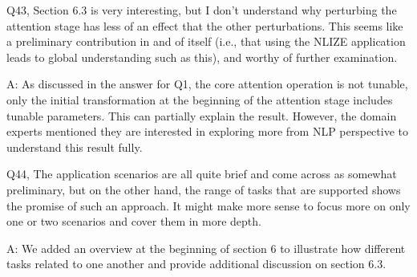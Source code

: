 Q43, Section 6.3 is very interesting, but I don't understand why perturbing the attention stage has less of an effect that the other perturbations. This seems like a preliminary contribution in and of itself (i.e., that using the NLIZE application leads to global understanding such as this), and worthy of further examination.

A: As discussed in the answer for Q1, the core attention operation is not tunable, only the initial transformation at the beginning of the attention stage includes tunable parameters. This can partially explain the result. However, the domain experts mentioned they are interested in exploring more from NLP perspective to understand this result fully.

Q44, The application scenarios are all quite brief and come across as somewhat preliminary, but on the other hand, the range of tasks that are supported shows the promise of such an approach. It might make more sense to focus more on only one or two scenarios and cover them in more depth.

A: We added an overview at the beginning of section 6 to illustrate how different tasks related to one another and provide additional discussion on section 6.3.
